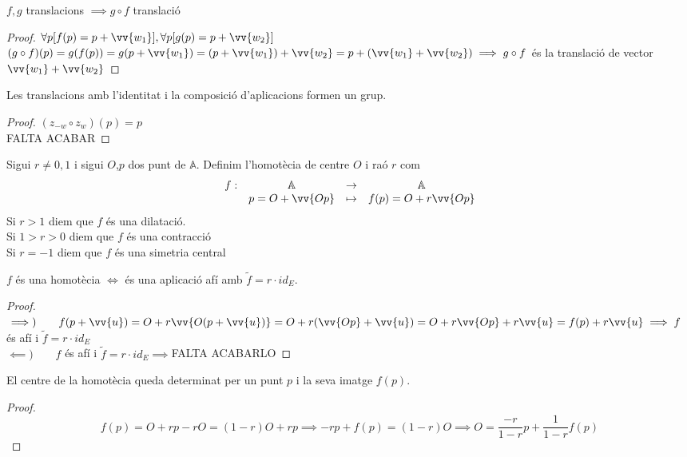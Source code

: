 \begin{prop}
	$f,g$ translacions $\implies g\circ f$ translació
\end{prop}
\begin{proof}
	$\forall p[f(p)=p+\vv{w_1}],\forall p[g(p)=p+\vv{w_2}]$ \\
	$(g\circ f)(p)=g(f(p))=g(p+\vv{w_1})=(p+\vv{w_1})+\vv{w_2}=p+(\vv{w_1}+\vv{w_2})\implies g\circ f$ és la translació de vector $\vv{w_1}+\vv{w_2}$
\end{proof}

\begin{prop}
	Les translacions amb l'identitat i la composició d'aplicacions formen un grup.
\end{prop}
\begin{proof}
	$(z_{-w}\circ z_w)(p)=p$\\
	FALTA ACABAR
\end{proof}

\begin{defn}
	Sigui $r\neq 0,1$ i sigui $O$,$p$ dos punt de $\mathbb{A}$. Definim l'homotècia de centre $O$ i raó $r$ com
	\[\begin{array}{rccc}
		f: & \mathbb{A} & \to &\mathbb{A} \\
		& p=O+\vv{Op} & \mapsto & f(p)=O+r\vv{Op} \\
	\end{array}\]
	Si $r>1$ diem que $f$ és una dilatació. \\
	Si $1>r>0$ diem que $f$ és una contracció \\
	Si $r=-1$ diem que $f$ és una simetria central
\end{defn}

\begin{prop}
	$f$ és una homotècia $\iff$ és una aplicació afí amb $\widetilde{f}=r\cdot id_E$.
\end{prop}
\begin{proof}
	$\implies )\hspace{2em}f(p+\vv{u})=O+r\vv{O(p+\vv{u})}=O+r(\vv{Op}+\vv{u})=O+r\vv{Op}+r\vv{u}=f(p)+r\vv{u}\implies f$ és afí i $\widetilde{f}=r\cdot id_E$ \bigskip \\
	$\impliedby )\hspace{2em}f$ és afí i $\widetilde{f}=r\cdot id_E\implies $FALTA ACABARLO
\end{proof}

\begin{prop}
	El centre de la homotècia queda determinat per un punt $p$ i la seva imatge $f(p)$.
\end{prop}
\begin{proof}
	\[f(p)=O+rp-rO=(1-r)O+rp\implies -rp+f(p)=(1-r)O\implies O=\frac{-r}{1-r}p+\frac{1}{1-r}f(p)\]
\end{proof}

